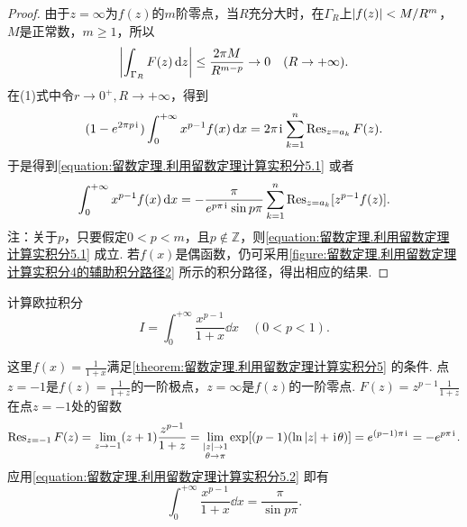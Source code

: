 \begin{theorem}
\begin{proof}
由于\(z=\infty\)为\(f(z)\)的\(m\)阶零点，当\(R\)充分大时，在\(\Gamma_R\)上\(\abs{f(z)}<M/R^m\)，\(M\)是正常数，\(m\geq1\)，所以\[
\abs{\int_{\Gamma_R} F(z) \dd{z}}
\leq \frac{2\pi M}{R^{m-p}} \to0\quad(R\to+\infty).
\]在(1)式中令\(r\to0^+,R\to+\infty\)，得到\[
(1-e^{2\pi p\kern1pt\mathrm{i}\kern1pt}) \int_0^{+\infty} x^{p-1} f(x) \dd{x}
= 2\pi\kern1pt\mathrm{i}\kern1pt \sum_{k=1}^n \operatorname{Res}_{z=a_k} F(z).
\]于是得到\cref{equation:留数定理.利用留数定理计算实积分5.1} 或者\begin{equation}\label{equation:留数定理.利用留数定理计算实积分5.2}
\int_0^{+\infty} x^{p-1} f(x) \dd{x}
= -\frac{\pi}{e^{p\pi\kern1pt\mathrm{i}\kern1pt} \sin p\pi} \sum_{k=1}^n \operatorname{Res}_{z=a_k}[z^{p-1} f(z)].
\end{equation}
注：关于\(p\)，只要假定\(0<p<m\)，且\(p\notin\mathbb{Z}\)，则\cref{equation:留数定理.利用留数定理计算实积分5.1} 成立.
若\(f(x)\)是偶函数，仍可采用\cref{figure:留数定理.利用留数定理计算实积分4的辅助积分路径2} 所示的积分路径，得出相应的结果.
\end{proof}
\end{theorem}

\begin{example}
计算欧拉积分\[
I = \int_0^{+\infty} \frac{x^{p-1}}{1+x} \dd{x} \quad(0<p<1).
\]
\begin{solution}
这里\(f(x) = \frac{1}{1+x}\)满足\cref{theorem:留数定理.利用留数定理计算实积分5} 的条件.
点\(z=-1\)是\(f(z) = \frac{1}{1+z}\)的一阶极点，\(z=\infty\)是\(f(z)\)的一阶零点.
\(F(z) = z^{p-1} \frac{1}{1+z}\)在点\(z=-1\)处的留数\[
\operatorname{Res}_{z=-1} F(z)
= \lim_{z\to-1} (z+1) \frac{z^{p-1}}{1+z}
= \lim_{\substack{\abs{z}\to1 \\ \theta\to\pi}} \exp[(p-1)(\ln\abs{z}+\kern1pt\mathrm{i}\kern1pt\theta)]
= e^{(p-1)\pi\kern1pt\mathrm{i}\kern1pt}
= -e^{p\pi\kern1pt\mathrm{i}\kern1pt}.
\]应用\cref{equation:留数定理.利用留数定理计算实积分5.2} 即有\begin{equation}
\int_0^{+\infty} \frac{x^{p-1}}{1+x} \dd{x} = \frac{\pi}{\sin p\pi}.
\end{equation}
\end{solution}
\end{example}

